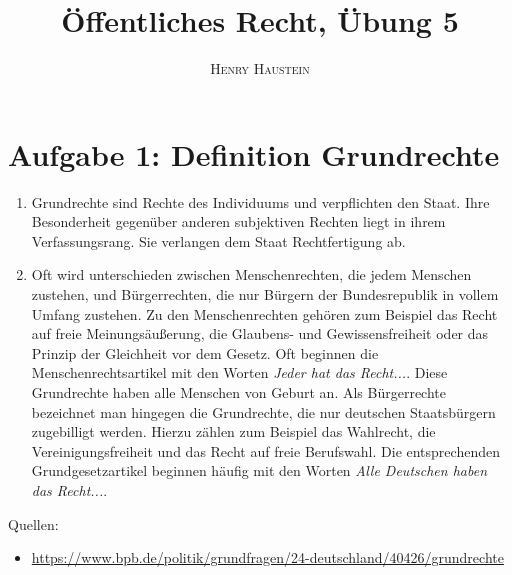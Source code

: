 \documentclass{article}
\title{\textbf{Öffentliches Recht, Übung 5}}
\author{\textsc{Henry Haustein}}
\date{}
\begin{document}
	\maketitle
	
	\section*{Aufgabe 1: Definition Grundrechte}
	\begin{enumerate}[label=(\alph*)]
		\item Grundrechte sind Rechte des Individuums und verpflichten den Staat. Ihre Besonderheit gegenüber anderen subjektiven Rechten liegt in ihrem Verfassungsrang. Sie verlangen dem Staat Rechtfertigung ab.
		\item Oft wird unterschieden zwischen Menschenrechten, die jedem Menschen zustehen, und Bürgerrechten, die nur Bürgern der Bundesrepublik in vollem Umfang zustehen. Zu den Menschenrechten gehören zum Beispiel das Recht auf freie Meinungsäußerung, die Glaubens- und Gewissensfreiheit oder das Prinzip der Gleichheit vor dem Gesetz. Oft beginnen die Menschenrechtsartikel mit den Worten \textit{Jeder hat das Recht...}. Diese Grundrechte haben alle Menschen von Geburt an. Als Bürgerrechte bezeichnet man hingegen die Grundrechte, die nur deutschen Staatsbürgern zugebilligt werden. Hierzu zählen zum Beispiel das Wahlrecht, die Vereinigungsfreiheit und das Recht auf freie Berufswahl. Die entsprechenden Grundgesetzartikel beginnen häufig mit den Worten \textit{Alle Deutschen haben das Recht...}.
	\end{enumerate}

	Quellen:
	\begin{itemize}
		\item \url{https://www.bpb.de/politik/grundfragen/24-deutschland/40426/grundrechte}
	\end{itemize}
\end{document}
